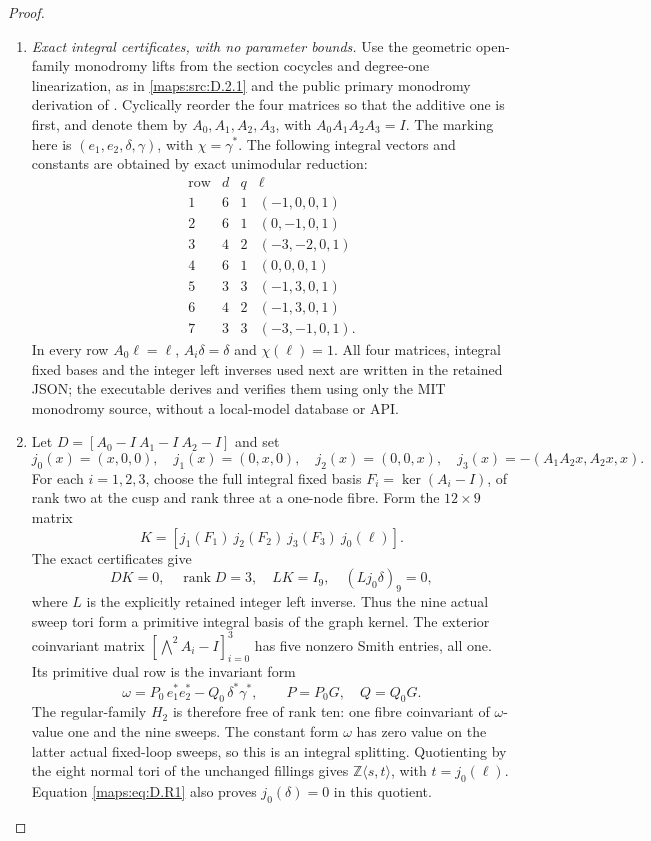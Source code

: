 \begin{proof}
\begin{enumerate}[label=\arabic*.,leftmargin=*]
\item \emph{Exact integral certificates, with no parameter bounds.}
Use the geometric open-family monodromy lifts from the section
cocycles and degree-one linearization, as in \ref{maps:src:D.2.1} and the
public primary monodromy derivation of \cite{manExplorer26}.
Cyclically reorder the four matrices so that the additive
one is first, and denote them by $A_0,A_1,A_2,A_3$, with
$A_0A_1A_2A_3=I$.
The marking here is $(e_1,e_2,\delta,\gamma)$, with
$\chi=\gamma^*$. The following integral vectors and constants
are obtained by exact unimodular reduction:
\[
 \begin{array}{c|r|r|l}
 \text{row}&d&q&\ell\\\hline
 1&6&1&(-1,0,0,1)\\
 2&6&1&(0,-1,0,1)\\
 3&4&2&(-3,-2,0,1)\\
 4&6&1&(0,0,0,1)\\
 5&3&3&(-1,3,0,1)\\
 6&4&2&(-1,3,0,1)\\
 7&3&3&(-3,-1,0,1).
 \end{array}
\]
In every row $A_0\ell=\ell$, $A_i\delta=\delta$ and
$\chi(\ell)=1$.
All four matrices, integral fixed bases and the integer
left inverses used next are written in the retained JSON;
the executable derives and verifies them using only the
MIT monodromy source, without a local-model database or API.

\item Let $D=[A_0-I\ A_1-I\ A_2-I]$ and set
\[
 j_0(x)=(x,0,0),\quad j_1(x)=(0,x,0),\quad
 j_2(x)=(0,0,x),\quad
 j_3(x)=-(A_1A_2x,A_2x,x).
\]
For each $i=1,2,3$, choose the full integral fixed basis
$F_i=\ker(A_i-I)$, of rank two at the cusp and rank three
at a one-node fibre. Form the $12\times9$ matrix
\[
 K=[j_1(F_1)\ j_2(F_2)\ j_3(F_3)\ j_0(\ell)].
\]
The exact certificates give
\[
 DK=0,\quad\operatorname{rank}D=3,\quad LK=I_9,\quad
 (Lj_0\delta)_9=0,
 \tag{D.R1}\label{maps:eq:D.R1}
\]
where $L$ is the explicitly retained integer left inverse.
Thus the nine actual sweep tori form a primitive integral
basis of the graph kernel. The exterior coinvariant matrix
$[\bigwedge^2A_i-I]_{i=0}^3$ has five nonzero Smith entries,
all one. Its primitive dual row is the invariant form
\[
 \omega=P_0\,e_1^*e_2^*-Q_0\,\delta^*\gamma^*,
 \qquad P=P_0G,\quad Q=Q_0G.
 \tag{D.R2}\label{maps:eq:D.R2}
\]
The regular-family $H_2$ is therefore free of rank ten:
one fibre coinvariant of $\omega$-value one and the nine
sweeps. The constant form $\omega$ has zero value on the
latter actual fixed-loop sweeps, so this is an integral
splitting. Quotienting by the eight normal tori of the
unchanged fillings gives
$\mathbb Z\langle s,t\rangle$, with $t=j_0(\ell)$.
Equation \eqref{maps:eq:D.R1} also proves $j_0(\delta)=0$ in this quotient.


\end{enumerate}
\end{proof}
